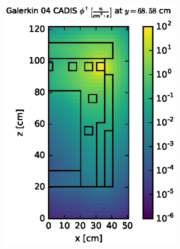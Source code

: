 \begin{figure}[!htb]
\begin{subfigure}{0.4\textwidth}
\includegraphics[max height=0.445\textheight]
{img/dlvn-plots/cad-adj/flux-gkn04-slice.eps}
\end{subfigure}
\\
\begin{subfigure}{0.4\textwidth}

\end{subfigure}
\end{figure}
